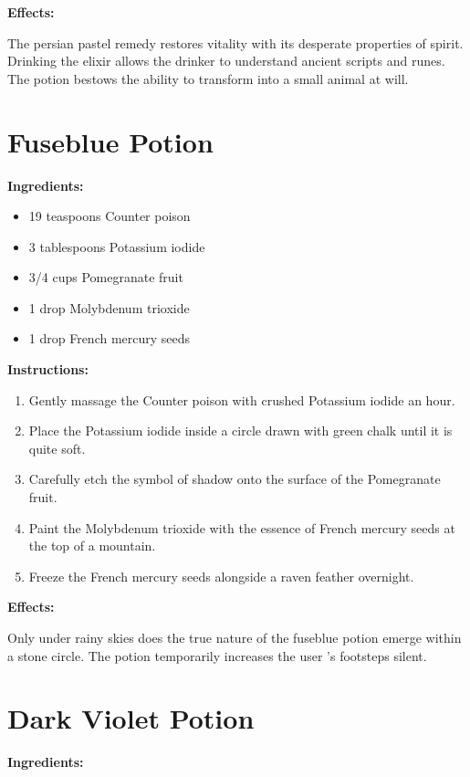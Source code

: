 \documentclass{article}
\begin{document}
\textbf{Effects:}

The persian pastel remedy restores vitality with its desperate properties of spirit. Drinking the elixir allows the drinker to understand ancient scripts and runes. The potion bestows the ability to transform into a small animal at will.

\newpage
\section*{Fuseblue Potion}

\textbf{Ingredients:}

\begin{itemize}
  \item 19 teaspoons Counter poison
  \item 3 tablespoons Potassium iodide
  \item 3/4 cups Pomegranate fruit
  \item 1 drop Molybdenum trioxide
  \item 1 drop French mercury seeds
\end{itemize}

\textbf{Instructions:}

\begin{enumerate}
  \item Gently massage the Counter poison with crushed Potassium iodide an hour.
  \item Place the Potassium iodide inside a circle drawn with green chalk until it is quite soft.
  \item Carefully etch the symbol of shadow onto the surface of the Pomegranate fruit.
  \item Paint the Molybdenum trioxide with the essence of French mercury seeds at the top of a mountain.
  \item Freeze the French mercury seeds alongside a raven feather overnight.
\end{enumerate}

\textbf{Effects:}

Only under rainy skies does the true nature of the fuseblue potion emerge within a stone circle. The potion temporarily increases the user 's footsteps silent.

\newpage
\section*{Dark Violet Potion}

\textbf{Ingredients:}
\end{document}
